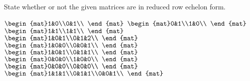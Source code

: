 

\begin{Exercise}[
name={},
title={}, 
difficulty=0,
origin={\cite{GH}}]
State whether or not the given matrices are in reduced row echelon form.
\begin{multicols}{3}
\Question $\begin{mat}1&0\\0&1\\ \end{mat}$
\Question $\begin{mat}0&1\\1&0\\ \end{mat}$
\Question $\begin{mat}1&1\\1&1\\ \end{mat}$
\Question $\begin{mat}1&0&1\\0&1&2\\ \end{mat}$
\Question $\begin{mat}1&0&0\\0&0&1\\ \end{mat}$
\Question $\begin{mat}1&0&1\\0&1&1\\ \end{mat}$
\Question $\begin{mat}0&0&0\\1&0&0\\ \end{mat}$
\Question $\begin{mat}0&0&0\\0&0&0\\ \end{mat}$
\Question $\begin{mat}1&1&1\\0&1&1\\0&0&1\\ \end{mat}$

\end{multicols}
\end{Exercise}
